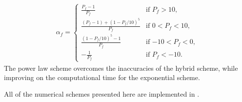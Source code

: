 \begin{description}
\begin{eqnarray}
\alpha_f = 
\begin{cases}
    \frac{P_f-1}{P_f} & \text{if $P_f > 10$,} \\
    \frac{(P_f-1)+(1-P_f/10)^5}{P_f} & \text{if $0 < P_f < 10$,} \\
    \frac{(1-P_f/10)^5 - 1}{P_f} & \text{if $-10 < P_f < 0$,} \\
    -\frac{1}{P_f} & \text{if $P_f < -10$.}
\end{cases}
\label{eqn:num:pls}
\end{eqnarray}
The power law scheme overcomes the inaccuracies of the hybrid scheme,
while improving on the computational time for the exponential scheme.
\end{description}

All of the numerical schemes presented here are implemented in \FiPy{}.







